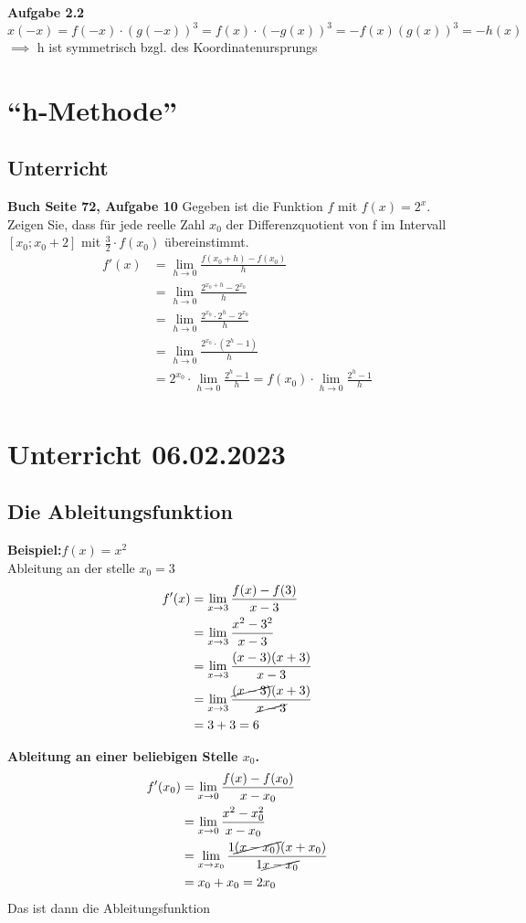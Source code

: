 \documentclass{report}
\begin{document}
\noindent\textbf{Aufgabe 2.2}
\[x(-x)=f(-x)\cdot (g(-x))^3=f(x)\cdot (-g(x))^3=-f(x)(g(x))^3=-h(x)\]
$\implies$ h ist symmetrisch bzgl. des Koordinatenursprungs
\clearpage%

\section{``h-Methode''}
\subsection{Unterricht}
\textbf{Buch Seite 72, Aufgabe 10}
Gegeben ist die Funktion $f$ mit $f(x)=2^x$. Zeigen Sie, dass für jede reelle Zahl $x_0$ der Differenzquotient von f im Intervall $[x_0; x_0+2]$ mit $\frac{3}{2}\cdot f(x_0)$ übereinstimmt. 
\begin{align*}
    f'(x) &= \lim_{h \to 0}\frac{f(x_0+h)-f(x_0)}{h} \\
          &= \lim_{h \to 0}\frac{2^{x_0+h}-2^{x_0}}{h} \\
          &= \lim_{h \to 0}\frac{2^{x_0}\cdot 2^h-2^{x_0}}{h} \\
          &= \lim_{h \to 0}\frac{2^{x_0}\cdot (2^h-1)}{h} \\
          &= 2^{x_0}\cdot \lim_{h \to 0}\frac{2^h-1}{h}=f(x_0)\cdot \lim_{h \to 0}\frac{2^h-1}{h} \\
\end{align*}

\section{Unterricht 06.02.2023}
\subsection{Die Ableitungsfunktion}
\textbf{Beispiel:}$f(x)=x^2$\\
Ableitung an der stelle $x_0=3$
\begin{align*}
  f'(x) &= \lim_{x \to 3}\frac{f(x)-f(3)}{x-3}\\
&= \lim_{x \to 3}\frac{x^2-3^2}{x-3}\\
&=\lim_{x \to 3}\frac{(x-3)(x+3)}{x-3}\\
&=\lim_{x\to3} \frac{\cancel{(x-3)}(x+3)}{\cancel{x-3}}\\
&=3+3=6\\
\end{align*}

\noindent\textbf{Ableitung an einer beliebigen Stelle $x_0$.}\\
\begin{align*}
  f'(x_0)&=\lim_{x\to 0}\frac{f(x)-f(x_0)}{x-x_0}\\
  &= \lim_{x\to 0}\frac{x^2-x_0^2}{x-x_0}\\
  &=\lim_{x\to x_0}\frac{1\cancel{(x-x_0)}(x+x_0)}{1\cancel{x-x_0}}\\
  &=x_0+x_0=2x_0\\
\end{align*}
Das ist dann die Ableitungsfunktion
\end{document}
